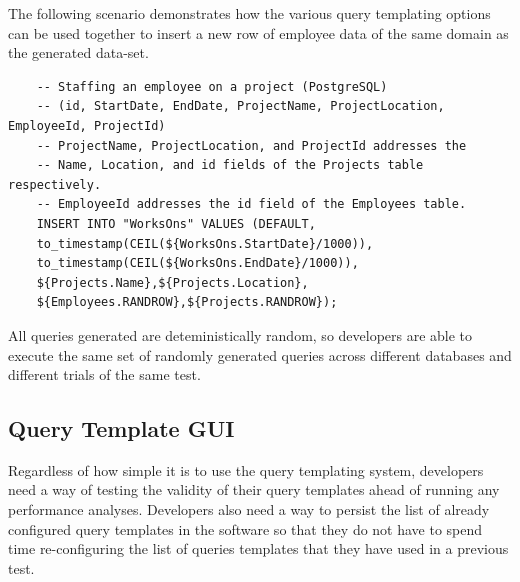 \documentclass[12pt]{article}
\begin{document}
\begin{spacing}{1.9}
	The following scenario demonstrates how the various query templating options can be used together to insert a new row of employee data of the same domain as the generated data-set.
	
	
	\begin{verbatim}
	-- Staffing an employee on a project (PostgreSQL)
	-- (id, StartDate, EndDate, ProjectName, ProjectLocation, EmployeeId, ProjectId)
	-- ProjectName, ProjectLocation, and ProjectId addresses the 
	-- Name, Location, and id fields of the Projects table respectively.
	-- EmployeeId addresses the id field of the Employees table.
	INSERT INTO "WorksOns" VALUES (DEFAULT, 
	to_timestamp(CEIL(${WorksOns.StartDate}/1000)), 
	to_timestamp(CEIL(${WorksOns.EndDate}/1000)),
	${Projects.Name},${Projects.Location},
	${Employees.RANDROW},${Projects.RANDROW});
	\end{verbatim}
	
	
	
	All queries generated are deteministically random, so developers are able to execute the same set of randomly generated queries across different databases and different trials of the same test.
	
	
	
	\subsection{ Query Template GUI}
	
	Regardless of how simple it is to use the query templating system, developers need a way of testing the validity of their query templates ahead of running any performance analyses. Developers also need a way to persist the list of already configured query templates in the software so that they do not have to spend time re-configuring the list of queries templates that they have used in a previous test.
	

\end{spacing}
\end{document}
